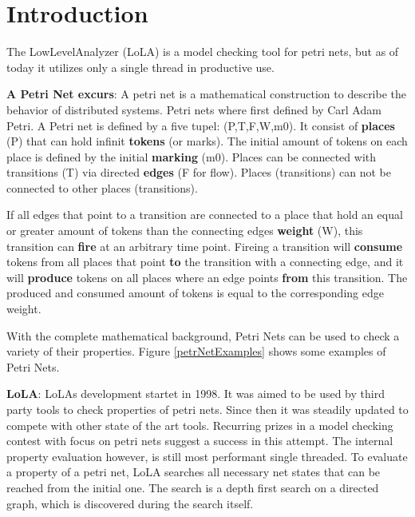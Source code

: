 \chapter{Introduction}

The LowLevelAnalyzer (LoLA) is a model checking tool for petri nets, but as of today it utilizes only a single thread in productive use.

\textbf{A Petri Net excurs}:
A petri net is a mathematical construction to describe the behavior of distributed systems. Petri nets where first defined by Carl Adam Petri\cite{petri1962kommunikation}. A Petri net is defined by a five tupel: (P,T,F,W,m0). It consist of \textbf{places} (P) that can hold infinit \textbf{tokens} (or marks). The initial amount of tokens on each place is defined by the initial \textbf{marking} (m0). Places can be connected with transitions (T) via directed \textbf{edges} (F for flow). Places (transitions) can not be connected to other places (transitions). 

If all edges that point to a transition are connected to a place that hold an equal or greater amount of tokens than the connecting edges \textbf{weight} (W), this transition can \textbf{fire} at an arbitrary time point. Fireing a transition will \textbf{consume} tokens from all places that point \textbf{to} the transition with a connecting edge, and it will \textbf{produce} tokens on all places where an edge points \textbf{from} this transition. The produced and consumed amount of tokens is equal to the corresponding edge weight.

With the complete mathematical background, Petri Nets can be used to check a variety of their properties. Figure \ref{petrNetExamples} shows some examples of Petri Nets.



\textbf{LoLA}:
LoLAs development startet in 1998. It was aimed to be used by third party tools to check properties of petri nets\cite{schmidt2000lola}. Since then it was steadily updated to compete with other state of the art tools. Recurring prizes in a model checking contest with focus on petri nets suggest a success in this attempt\cite{MCC2017}.
The internal property evaluation however, is still most performant single threaded. To evaluate a property of a petri net, LoLA searches all necessary net states that can be reached from the initial one. The search is a depth first search on a directed graph, which is discovered during the search itself.

